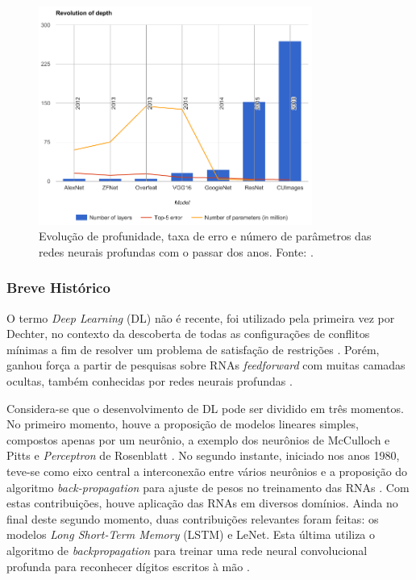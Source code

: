 \begin{figure}[ht]
	\centering
	\caption{Evolução de profunidade, taxa de erro e número de parâmetros das redes neurais profundas com o passar dos anos. Fonte: \cite{mediumcnn}.}
	\label{fig:compara_redes}
	\includegraphics[width=0.8\textwidth]{img/compara_redes.png}
\end{figure}

\subsubsection{Breve Histórico}

O termo \emph{Deep Learning} (DL) não é recente, foi utilizado pela primeira vez por Dechter, no contexto da descoberta de todas as configurações de conflitos mínimas a fim de resolver um problema de satisfação de restrições \cite{dechter1986learning}. Porém, ganhou força a partir de pesquisas sobre RNAs \emph{feedforward} com muitas camadas ocultas, também conhecidas por redes neurais profundas \cite{deng2014deep}.

Considera-se que o desenvolvimento de DL pode ser dividido em três momentos. No primeiro momento, houve a proposição de modelos lineares simples, compostos apenas por um neurônio, a exemplo dos neurônios de McCulloch e Pitts \cite{mcculloch1943logical} e \emph{Perceptron} de Rosenblatt  \cite{rosenblatt1958perceptron}. No segundo instante, iniciado nos anos 1980, teve-se como eixo central a interconexão entre vários neurônios e a proposição do algoritmo \emph{back-propagation} para ajuste de pesos no treinamento das RNAs \cite{rumelhart1986parallel,rumelhart1986backpropagation}. Com estas contribuições, houve aplicação das RNAs em diversos domínios. Ainda no final deste segundo momento, duas contribuições relevantes foram feitas: os modelos \emph{Long Short-Term Memory} (LSTM) e LeNet. Esta última utiliza o algoritmo de \emph{backpropagation} para treinar uma rede neural convolucional profunda para reconhecer dígitos escritos à mão \cite{lenet}.

